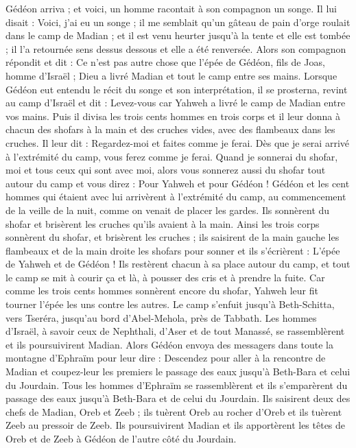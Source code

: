\begin{multicols}{2}
Gédéon arriva ; et voici, un homme racontait à son compagnon un songe. Il lui disait : Voici, j'ai eu un songe ; il me semblait qu'un gâteau de pain d'orge roulait dans le camp de Madian ; et il est venu heurter jusqu'à la tente et elle est tombée ; il l'a retournée sens dessus dessous et elle a été renversée.
Alors son compagnon répondit et dit : Ce n'est pas autre chose que l'épée de Gédéon, fils de Joas, homme d'Israël ; Dieu a livré Madian et tout le camp entre ses mains.
Lorsque Gédéon eut entendu le récit du songe et son interprétation, il se prosterna, revint au camp d'Israël et dit : Levez-vous car Yahweh a livré le camp de Madian entre vos mains.
Puis il divisa les trois cents hommes en trois corps et il leur donna à chacun des shofars à la main et des cruches vides, avec des flambeaux dans les cruches.
Il leur dit : Regardez-moi et faites comme je ferai. Dès que je serai arrivé à l'extrémité du camp, vous ferez comme je ferai.
Quand je sonnerai du shofar, moi et tous ceux qui sont avec moi, alors vous sonnerez aussi du shofar tout autour du camp et vous direz : Pour Yahweh et pour Gédéon !
Gédéon et les cent hommes qui étaient avec lui arrivèrent à l'extrémité du camp, au commencement de la veille de la nuit, comme on venait de placer les gardes. Ils sonnèrent du shofar et brisèrent les cruches qu'ils avaient à la main.
Ainsi les trois corps sonnèrent du shofar, et brisèrent les cruches ; ils saisirent de la main gauche les flambeaux et de la main droite les shofars pour sonner et ils s'écrièrent : L'épée de Yahweh et de Gédéon !
Ils restèrent chacun à sa place autour du camp, et tout le camp se mit à courir ça et là, à pousser des cris et à prendre la fuite.
Car comme les trois cents hommes sonnèrent encore du shofar, Yahweh leur fit tourner l'épée les uns contre les autres. Le camp s'enfuit jusqu'à Beth-Schitta, vers Tseréra, jusqu'au bord d'Abel-Mehola, près de Tabbath.
Les hommes d'Israël, à savoir ceux de Nephthali, d'Aser et de tout Manassé, se rassemblèrent et ils poursuivirent Madian.
Alors Gédéon envoya des messagers dans toute la montagne d'Ephraïm pour leur dire : Descendez pour aller à la rencontre de Madian et coupez-leur les premiers le passage des eaux jusqu'à Beth-Bara et celui du Jourdain. Tous les hommes d'Ephraïm se rassemblèrent et ils s'emparèrent du passage des eaux jusqu'à Beth-Bara et de celui du Jourdain.
Ils saisirent deux des chefs de Madian, Oreb et Zeeb ; ils tuèrent Oreb au rocher d'Oreb et ils tuèrent Zeeb au pressoir de Zeeb. Ils poursuivirent Madian et ils apportèrent les têtes de Oreb et de Zeeb à Gédéon de l'autre côté du Jourdain.

\end{multicols}
